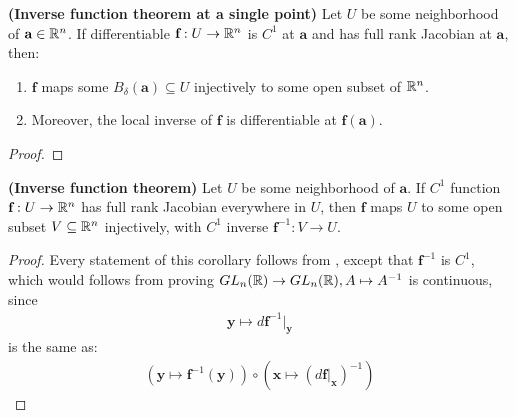 \documentclass{report}
\begin{document}
\begin{theorem}
\label{THifta}
\textbf{(Inverse function theorem at a single point)} Let $U$ be some neighborhood of  $\textbf{a}\in \mathbb{R}^n$. If differentiable $\textbf{f}:U\rightarrow \mathbb{R}^n$ is $C^1$ at $\textbf{a}$ and has full rank Jacobian at $\textbf{a}$, then: 
\begin{enumerate}[label=(\roman*)]
  \item  $\textbf{f}$ maps some $B_\delta (\textbf{a})\subseteq U$ injectively to some open subset of $\mathbb{R}^n$. 
  \item Moreover, the local inverse of $\textbf{f}$ is differentiable at $\textbf{f}(\textbf{a})$. 
\end{enumerate}
\end{theorem} 
\begin{proof}

\end{proof}
\begin{corollary}
\textbf{(Inverse function theorem)} Let $U$ be some neighborhood of $\textbf{a}$. If $C^1$ function $\textbf{f}:U\rightarrow \mathbb{R}^n$ has full rank Jacobian everywhere in $U$, then $\textbf{f}$ maps $U$ to some open subset $V \subseteq \mathbb{R}^n$ injectively, with $C^1$ inverse $\textbf{f}^{-1}:V\rightarrow U$.  
\end{corollary}
\begin{proof}
Every statement of this corollary follows from , except that $\textbf{f}^{-1}$ is $C^1$, which would follows from proving $GL_n(\mathbb{R})\rightarrow GL_n(\mathbb{R}),A \mapsto A^{-1}$ is continuous, since 
\begin{align*}
\textbf{y}\mapsto d\textbf{f}^{-1}|_\textbf{y} 
\end{align*}
is the same as: 
\begin{align*}
\left(\textbf{y}\mapsto \textbf{f}^{-1}(\textbf{y}) \right)\circ \left(\textbf{x} \mapsto (d\textbf{f}|_\textbf{x})^{-1} \right)
\end{align*}

\end{proof}
\end{document}
